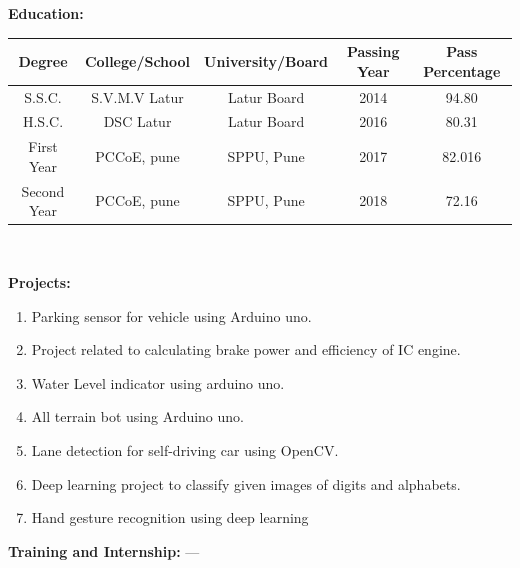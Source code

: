 \documentclass[10pt,twoside,a4paper]{article}
\begin{document}
\noindent
\textbf{Education:}
\begin{center}
\begin{tabular}{|c|c|c|c|c|}
\hline
Degree & College/School & University/Board & Passing Year & Pass Percentage \\
\hline
S.S.C. & S.V.M.V Latur & Latur Board & 2014 & 94.80 \\
\hline
H.S.C. & DSC Latur & Latur Board & 2016 & 80.31 \\
\hline
First Year & PCCoE, pune & SPPU, Pune & 2017 & 82.016 \\
\hline
Second Year & PCCoE, pune & SPPU, Pune & 2018 & 72.16 \\
\hline
\end{tabular}
\\
\end{center}


\noindent
\textbf{Projects:} 
\begin{enumerate}
\item Parking sensor for vehicle using Arduino uno.
\item Project related to calculating brake power and efficiency of IC engine.
\item Water Level indicator using arduino uno.
\item All terrain bot using Arduino uno.
\item Lane detection for self-driving car using OpenCV.
\item  Deep learning project to classify given images of digits and alphabets.
\item Hand gesture recognition using deep learning
\\
\end{enumerate}

\noindent
\textbf{Training and Internship:}
---\\
\\
\end{document}
